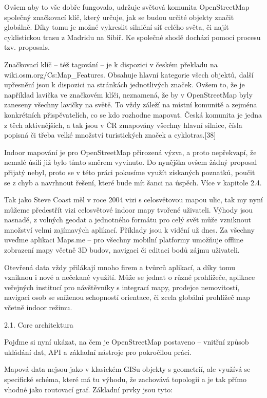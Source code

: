 Ovšem aby to vše dobře fungovalo, udržuje světová komunita OpenStreetMap společný značkovací klíč, který určuje, jak se budou určité objekty značit globálně. Díky tomu je možné vykreslit silniční síť celého světa, či najít cyklistickou trasu z Madridu na Sibiř. Ke společné shodě dochází pomocí procesu tzv. proposals.

Značkovací klíč – též tagování – je k dispozici v českém překladu na wiki.osm.org/Cs:Map\_Features. Obsahuje hlavní kategorie všech objektů, další upřesnění jsou k dispozici na stránkách jednotlivých značek. Ovšem to, že je například lavička ve značkovém klíči, neznamená, že by v OpenStreetMap byly zaneseny všechny lavičky na světě. To vždy záleží na místní komunitě a zejména konkrétních přispěvatelích, co se kdo rozhodne mapovat. Česká komunita je jedna z těch aktivnějších, a tak jsou v ČR zmapovány všechny hlavní silnice, čísla popisná či třeba velké množství turistických značek a cyklotras.[38]

Indoor mapování je pro OpenStreetMap přirozená výzva, a proto nepřekvapí, že nemalé úsilí již bylo tímto směrem vyvinuto. Do nynějška ovšem žádný proposal přijatý nebyl, proto se v této práci pokusíme využít získaných poznatků, poučit se z chyb a navrhnout řešení, které bude mít šanci na úspěch. Více v kapitole 2.4.

Tak jako Steve Coast měl v roce 2004 vizi s celosvětovou mapou ulic, tak my nyní můžeme předestřít vizi celosvětové indoor mapy tvořené uživateli. Výhody jsou nasnadě, z volných geodat a jednotného formátu pro celý svět může vzniknout množství velmi zajímavých aplikací. Příklady jsou k vidění už dnes. Za všechny uveďme aplikaci Maps.me – pro všechny mobilní platformy umožňuje offline zobrazení mapy včetně 3D budov, navigaci či editaci bodů zájmu uživateli.

Otevřená data vždy přilákají mnoho firem a tvůrců aplikací, a díky tomu vzniknou i nové a nečekané využití. Může se jednat o různé prohlížeče, aplikace veřejných institucí pro návštěvníky s integrací mapy, prodejce nemovitostí, navigaci osob se sníženou schopností orientace, či zcela globální prohlížeč map včetně indoor režimu.

2.1. Core architektura



Pojďme si nyní ukázat, na čem je OpenStreetMap postaveno – vnitřní způsob ukládání dat, API a základní nástroje pro pokročilou práci.

Mapová data nejsou jako v klasickém GISu objekty s geometrií, ale využívá se specifické schéma, které má tu výhodu, že zachovává topologii a je tak přímo vhodné jako routovací graf. Základní prvky jsou tyto:

